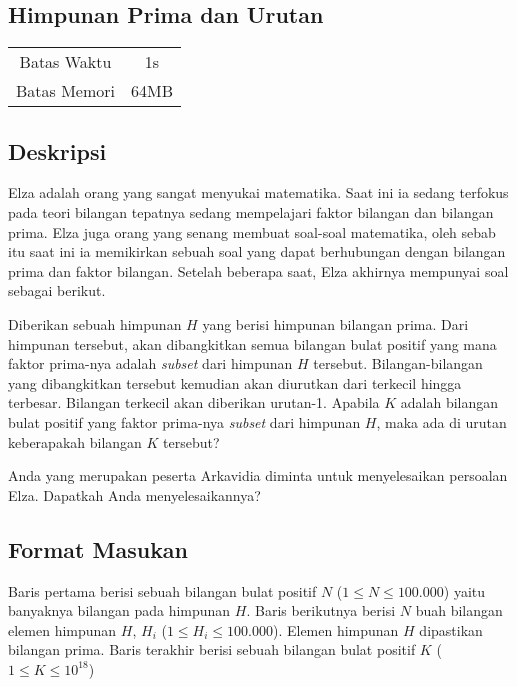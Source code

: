 \documentclass{article}
\begin{document}
\begin{center}
    \section*{Himpunan Prima dan Urutan} %

    \begin{tabular}{ | c c | }
        \hline
        Batas Waktu  & 1s \\    %
        Batas Memori & 64MB \\  %
        \hline
    \end{tabular}
\end{center}

\subsection*{Deskripsi}

Elza adalah orang yang sangat menyukai matematika. Saat ini ia sedang terfokus pada teori bilangan tepatnya 
sedang mempelajari faktor bilangan dan bilangan prima. Elza juga orang yang senang membuat soal-soal matematika, 
oleh sebab itu saat ini ia memikirkan sebuah soal yang dapat berhubungan dengan bilangan prima dan faktor bilangan. 
Setelah beberapa saat, Elza akhirnya mempunyai soal sebagai berikut.

Diberikan sebuah himpunan $H$ yang berisi himpunan bilangan prima. Dari himpunan tersebut, akan dibangkitkan 
semua bilangan bulat positif yang mana faktor prima-nya adalah \textit{subset} dari himpunan $H$ tersebut. 
Bilangan-bilangan yang dibangkitkan tersebut kemudian akan diurutkan dari terkecil hingga terbesar. Bilangan 
terkecil akan diberikan urutan-1. Apabila $K$ adalah bilangan bulat positif yang faktor prima-nya \textit{subset}
dari himpunan $H$, maka ada di urutan keberapakah bilangan $K$ tersebut?

Anda yang merupakan peserta Arkavidia diminta untuk menyelesaikan persoalan Elza. Dapatkah Anda menyelesaikannya?

\subsection*{Format Masukan}
Baris pertama berisi sebuah bilangan bulat positif $N$ ($1 \leq N \leq 100.000$) yaitu banyaknya bilangan pada
himpunan $H$. Baris berikutnya berisi $N$ buah bilangan elemen himpunan $H$, $H_i$ ($1 \leq H_i \leq 100.000$). Elemen himpunan $H$
dipastikan bilangan prima. 
Baris terakhir berisi sebuah bilangan bulat positif $K$ ($1 \leq K \leq 10^{18}$)
\end{document}
